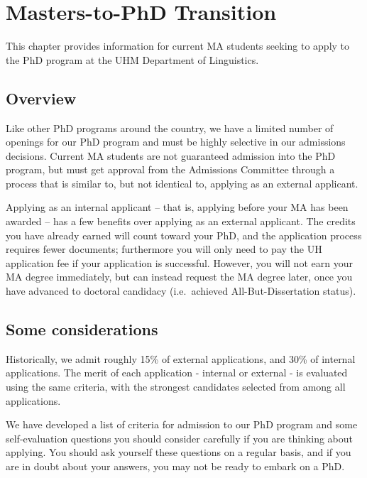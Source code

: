 \documentclass[
]{book}
\begin{document}
\hypertarget{masters-to-phd-transition}{%
\chapter{Masters-to-PhD Transition}\label{masters-to-phd-transition}}

This chapter provides information for current MA students seeking to apply to the PhD program at the UHM Department of Linguistics.

\hypertarget{overview}{%
\section{Overview}\label{overview}}

Like other PhD programs around the country, we have a limited number of openings for our PhD program and must be highly selective in our admissions decisions. Current MA students are not guaranteed admission into the PhD program, but must get approval from the Admissions Committee through a process that is similar to, but not identical to, applying as an external applicant.

Applying as an internal applicant -- that is, applying before your MA has been awarded -- has a few benefits over applying as an external applicant. The credits you have already earned will count toward your PhD, and the application process requires fewer documents; furthermore you will only need to pay the UH application fee if your application is successful. However, you will not earn your MA degree immediately, but can instead request the MA degree later, once you have advanced to doctoral candidacy (i.e.~achieved All-But-Dissertation status).

\hypertarget{some-considerations}{%
\section{Some considerations}\label{some-considerations}}

Historically, we admit roughly 15\% of external applications, and 30\% of internal applications. The merit of each application - internal or external - is evaluated using the same criteria, with the strongest candidates selected from among all applications.

We have developed a list of criteria for admission to our PhD program and some self-evaluation questions you should consider carefully if you are thinking about applying. You should ask yourself these questions on a regular basis, and if you are in doubt about your answers, you may not be ready to embark on a PhD.
\end{document}

